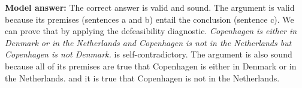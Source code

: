 \documentclass[a4,11pt]{article}
\begin{document}
\begin{enumerate}[leftmargin = 12pt]
 {\bf Model answer:} The correct answer is valid and sound. The argument is valid because its premises (sentences a and b) entail the conclusion (sentence c). We can prove that by applying the defeasibility diagnostic. {\em Copenhagen is either in Denmark or in the Netherlands and Copenhagen is not in the Netherlands but Copenhagen is not Denmark.} is self-contradictory. The argument is also sound because all of its premises are true that Copenhagen is either in Denmark or in the Netherlands.
 and it is true that Copenhagen is not in the Netherlands. 
 


\end{enumerate}
\end{document}
